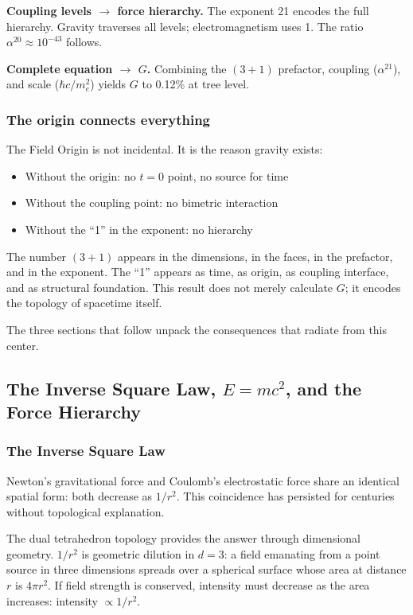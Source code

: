 \documentclass[aps,prd,preprint,superscriptaddress,showpacs,preprintnumbers,amsmath,amssymb,nofootinbib]{revtex4-2}
\begin{document}
\textbf{Coupling levels $\rightarrow$ force hierarchy.} The exponent 21 encodes the full hierarchy. Gravity traverses all levels; electromagnetism uses 1. The ratio $\alpha^{20} \approx 10^{-43}$ follows.

\textbf{Complete equation $\rightarrow$ $G$.} Combining the $(3+1)$ prefactor, coupling ($\alpha^{21}$), and scale ($\hbar c/m_e^2$) yields $G$ to 0.12\% at tree level.

\subsubsection*{The origin connects everything}

The Field Origin is not incidental. It is the reason gravity exists:
\begin{itemize}
\item Without the origin: no $t = 0$ point, no source for time
\item Without the coupling point: no bimetric interaction
\item Without the ``1'' in the exponent: no hierarchy
\end{itemize}

The number $(3{+}1)$ appears in the dimensions, in the faces, in the prefactor, and in the exponent. The ``1'' appears as time, as origin, as coupling interface, and as structural foundation. This result does not merely calculate $G$; it encodes the topology of spacetime itself.

The three sections that follow unpack the consequences that radiate from this center.

\subsection{The Inverse Square Law, $E = mc^2$, and the Force Hierarchy}
\label{subsec:inverse-hierarchy}

\subsubsection*{The Inverse Square Law}

Newton's gravitational force and Coulomb's electrostatic force share an identical spatial form: both decrease as $1/r^2$. This coincidence has persisted for centuries without topological explanation.

The dual tetrahedron topology provides the answer through dimensional geometry. $1/r^2$ is geometric dilution in $d = 3$: a field emanating from a point source in three dimensions spreads over a spherical surface whose area at distance $r$ is $4\pi r^2$. If field strength is conserved, intensity must decrease as the area increases: intensity $\propto 1/r^2$.
\end{document}
